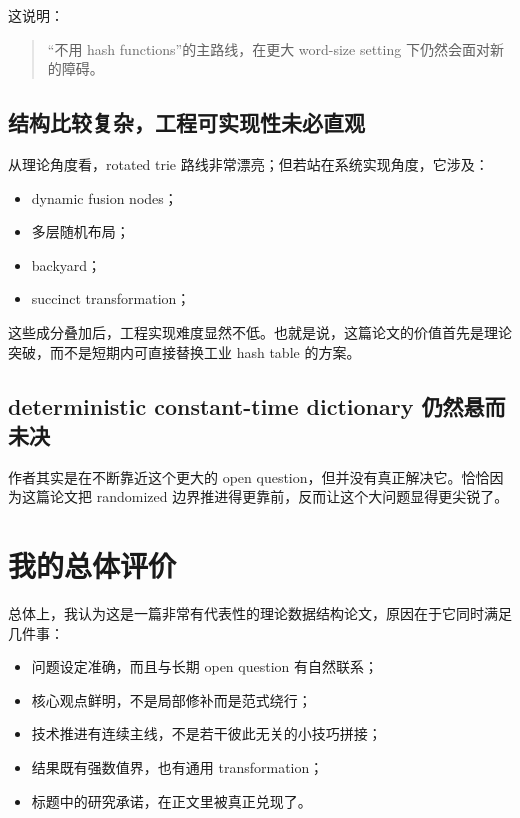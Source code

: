 \documentclass[12pt]{article}
\begin{document}
这说明：

\begin{quote}“不用 hash functions”的主路线，在更大 word-size setting 下仍然会面对新的障碍。\end{quote}

\subsection{结构比较复杂，工程可实现性未必直观}

从理论角度看，rotated trie 路线非常漂亮；但若站在系统实现角度，它涉及：

\begin{itemize}

\item dynamic fusion nodes；

\item 多层随机布局；

\item backyard；

\item succinct transformation；

\end{itemize}

这些成分叠加后，工程实现难度显然不低。也就是说，这篇论文的价值首先是理论突破，而不是短期内可直接替换工业 hash table 的方案。

\subsection{deterministic constant-time dictionary 仍然悬而未决}

作者其实是在不断靠近这个更大的 open question，但并没有真正解决它。恰恰因为这篇论文把 randomized 边界推进得更靠前，反而让这个大问题显得更尖锐了\cite[Sec.~1 and Lemma~3]{kuszmaul2022}。

\section{我的总体评价}

总体上，我认为这是一篇非常有代表性的理论数据结构论文，原因在于它同时满足几件事：

\begin{itemize}

\item 问题设定准确，而且与长期 open question 有自然联系；

\item 核心观点鲜明，不是局部修补而是范式绕行；

\item 技术推进有连续主线，不是若干彼此无关的小技巧拼接；

\item 结果既有强数值界，也有通用 transformation；

\item 标题中的研究承诺，在正文里被真正兑现了。

\end{itemize}
\end{document}
